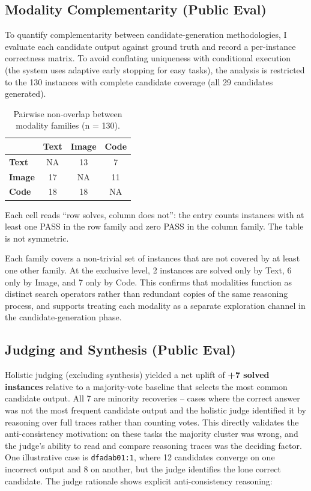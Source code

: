 \documentclass[conference]{IEEEtran}
\begin{document}
\subsection{Modality Complementarity (Public
Eval)}\label{modality-complementarity-public-eval}

To quantify complementarity between candidate-generation methodologies,
I evaluate each candidate output against ground truth and record a
per-instance correctness matrix. To avoid conflating uniqueness with
conditional execution (the system uses adaptive early stopping for easy
tasks), the analysis is restricted to the 130 instances with complete
candidate coverage (all 29 candidates generated).

\begin{table}[htbp]
\caption{Pairwise non-overlap between modality families (n = 130).}
\begin{center}
\footnotesize
\begin{tabular}{|l|c|c|c|}
\hline
 & \textbf{Text} & \textbf{Image} & \textbf{Code} \\
\hline
\textbf{Text} & NA & 13 & 7 \\
\textbf{Image} & 17 & NA & 11 \\
\textbf{Code} & 18 & 18 & NA \\
\hline
\end{tabular}
\end{center}
\end{table}

Each cell reads ``row solves, column does not'': the entry counts
instances with at least one PASS in the row family and zero PASS in the
column family. The table is not symmetric.

Each family covers a non-trivial set of instances that are not covered
by at least one other family. At the exclusive level, 2 instances are
solved only by Text, 6 only by Image, and 7 only by Code. This confirms
that modalities function as distinct search operators rather than
redundant copies of the same reasoning process, and supports treating
each modality as a separate exploration channel in the
candidate-generation phase.

\subsection{Judging and Synthesis (Public
Eval)}\label{judging-and-synthesis-public-eval}

Holistic judging (excluding synthesis) yielded a net uplift of
\textbf{+7 solved instances} relative to a majority-vote baseline that
selects the most common candidate output. All 7 are minority recoveries
-- cases where the correct answer was not the most frequent candidate
output and the holistic judge identified it by reasoning over full
traces rather than counting votes. This directly validates the
anti-consistency motivation: on these tasks the majority cluster was
wrong, and the judge's ability to read and compare reasoning traces was
the deciding factor. One illustrative case is \texttt{dfadab01:1}, where
12 candidates converge on one incorrect output and 8 on another, but the
judge identifies the lone correct candidate. The judge rationale shows
explicit anti-consistency reasoning:
\end{document}
